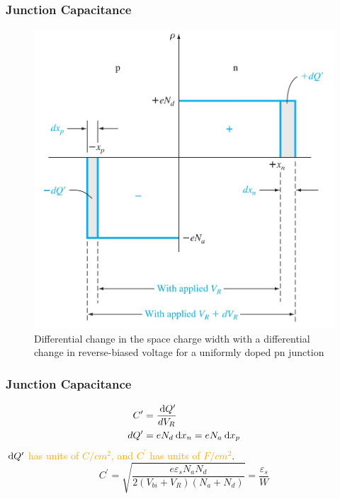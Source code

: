 \documentclass{beamer}
\begin{document}
    \begin{frame} \frametitle{Junction Capacitance}
        \begin{figure}[H]
            \centering
            \includegraphics[width=0.6\linewidth]{Junction-capacitance.jpg}
            \caption{Differential change in the space charge width with a differential change in reverse-biased voltage for a uniformly doped pn junction}
            \label{fig:Junction-capacitance.jpg}
        \end{figure}
    \end{frame}

    \begin{frame} \frametitle{Junction Capacitance}
        \begin{equation*}
            \begin{aligned}
                C^\prime &= \frac{\: \mathrm{d} Q^\prime}{d V_R} \\
                d Q^\prime &= e N_d \: \mathrm{d} x_n = e N_a \: \mathrm{d} x_p
            \end{aligned}
        \end{equation*}
        \textcolor{orange}{$\: \mathrm{d} Q^\prime$ has units of $C/cm^2$, and $C^\prime$ has units of $F/cm^2$}.
        \begin{equation*}
            \boxed{C^\prime = \sqrt{\frac{e \varepsilon_s N_a N_d}{2 (V_{bi} + V_R) (N_a + N_d)} } = \frac{\varepsilon_s}{W} }
        \end{equation*}
    \end{frame}
\end{document}
